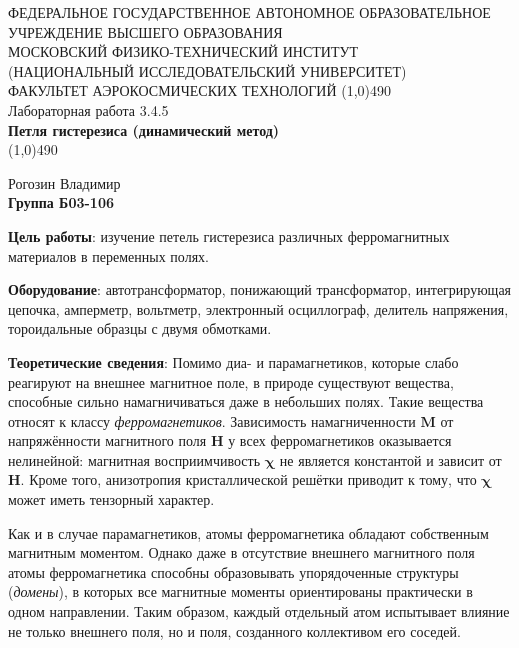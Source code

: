 \documentclass[a4paper,12pt]{article}
\begin{document}
\begin{titlepage}
\begin{center}
\large{\small ФЕДЕРАЛЬНОЕ ГОСУДАРСТВЕННОЕ АВТОНОМНОЕ ОБРАЗОВАТЕЛЬНОЕ\\ УЧРЕЖДЕНИЕ ВЫСШЕГО ОБРАЗОВАНИЯ \\ МОСКОВСКИЙ ФИЗИКО-ТЕХНИЧЕСКИЙ ИНСТИТУТ\\ (НАЦИОНАЛЬНЫЙ ИССЛЕДОВАТЕЛЬСКИЙ УНИВЕРСИТЕТ)\\ ФАКУЛЬТЕТ АЭРОКОСМИЧЕСКИХ ТЕХНОЛОГИЙ}
\vfill
\line(1,0){490}\\[1mm]
\huge{Лабораторная работа 3.4.5}\\
\huge\textbf{Петля гистерезиса (динамический метод)}\\
\line(1,0){490}\\[1mm]
\vfill
\begin{flushright}
\normalsize{Рогозин Владимир}\\
\normalsize{\textbf{Группа Б03-106}}\\
\end{flushright}
\end{center}
\end{titlepage}


\textbf{Цель работы}: 
изучение петель гистерезиса различных ферромагнитных материалов в переменных полях.

\textbf{Оборудование}:
автотрансформатор, понижающий трансформатор, интегрирующая цепочка, амперметр, вольтметр, электронный осциллограф, делитель напряжения, тороидальные образцы с двумя обмотками.

\textbf{Теоретические сведения}:
Помимо диа- и парамагнетиков, которые слабо реагируют на внешнее магнитное поле, в природе существуют вещества, способные сильно намагничиваться даже в небольших полях. Такие вещества относят к классу \textit{ферромагнетиков}. Зависимость намагниченности $\mathbf{M}$ от напряжённости магнитного поля $\mathbf{H}$ у всех ферромагнетиков оказывается нелинейной: магнитная восприимчивость $\mathbf{\chi}$ не является константой и зависит от $\mathbf{H}$. Кроме того, анизотропия кристаллической решётки приводит к тому, что $\mathbf{\chi}$ может иметь тензорный характер.

Как и в случае парамагнетиков, атомы ферромагнетика обладают собственным магнитным моментом. Однако даже в отсутствие внешнего магнитного поля атомы ферромагнетика способны образовывать упорядоченные структуры (\textit{домены}), в которых все магнитные моменты ориентированы практически в одном направлении. Таким образом, каждый отдельный атом испытывает влияние не только внешнего поля, но и поля, созданного коллективом его соседей.
\end{document}
